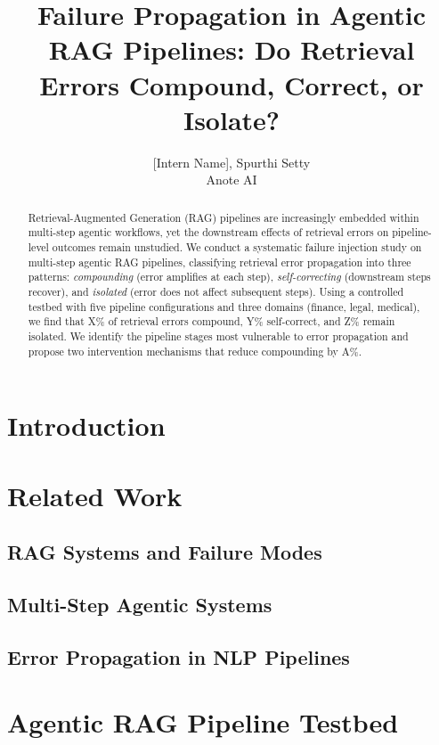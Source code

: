 \documentclass{article}
\title{Failure Propagation in Agentic RAG Pipelines: Do Retrieval Errors Compound, Correct, or Isolate?}
\author{[Intern Name], Spurthi Setty \\
Anote AI}
\date{}
\begin{document}
\maketitle

\begin{abstract}
\noindent
Retrieval-Augmented Generation (RAG) pipelines are increasingly embedded within multi-step agentic workflows, yet the downstream effects of retrieval errors on pipeline-level outcomes remain unstudied. We conduct a systematic failure injection study on multi-step agentic RAG pipelines, classifying retrieval error propagation into three patterns: \textit{compounding} (error amplifies at each step), \textit{self-correcting} (downstream steps recover), and \textit{isolated} (error does not affect subsequent steps). Using a controlled testbed with five pipeline configurations and three domains (finance, legal, medical), we find that X\% of retrieval errors compound, Y\% self-correct, and Z\% remain isolated. We identify the pipeline stages most vulnerable to error propagation and propose two intervention mechanisms that reduce compounding by A\%.
\end{abstract}

\section{Introduction}

\section{Related Work}
\subsection{RAG Systems and Failure Modes}
\subsection{Multi-Step Agentic Systems}
\subsection{Error Propagation in NLP Pipelines}

\section{Agentic RAG Pipeline Testbed}
\end{document}
